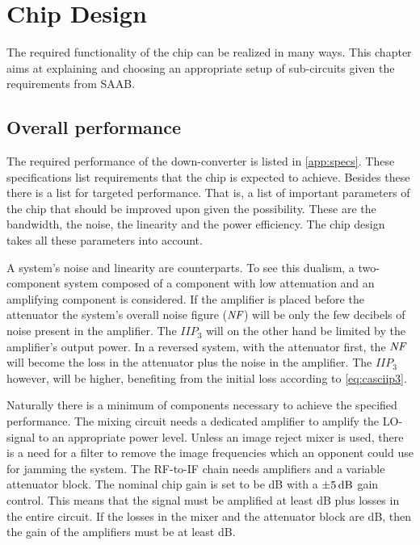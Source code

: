 \chapter{Chip Design}\label{chap:sysdes}

	The required functionality of the chip can be realized in many ways. This chapter aims at explaining and choosing an appropriate setup of sub-circuits given the requirements from SAAB.

	\section{Overall performance}
		The required performance of the down-converter is listed in \autoref{app:specs}. These specifications list requirements that the chip is expected to achieve. Besides these there is a list for targeted performance. That is, a list of important parameters of the chip that should be improved upon given the possibility. These are the bandwidth, the noise, the linearity and the power efficiency. The chip design takes all these parameters into account.

		A system's noise and linearity are counterparts. To see this dualism, a two-component system composed of a component with low attenuation and an amplifying component is considered. If the amplifier is placed before the attenuator the system's overall noise figure ($\emph{NF}$) will be only the few decibels of noise present in the amplifier. The $IIP_3$ will on the other hand be limited by the amplifier's output power. In a reversed system, with the attenuator first, the $\emph{NF}$ will become the loss in the attenuator plus the noise in the amplifier. The $IIP_3$ however, will be higher, benefiting from the initial loss according to \autoref{eq:casciip3}.

		Naturally there is a minimum of components necessary to achieve the specified performance. The mixing circuit needs a dedicated amplifier to amplify the LO-signal to an appropriate power level. Unless an image reject mixer is used, there is a need for a filter to remove the image frequencies which an opponent could use for jamming the system. The RF-to-IF chain needs amplifiers and a variable attenuator block. The nominal chip gain is set to be \unit[8--10]{dB} with a $\unit[\pm 5]{dB}$ gain control. This means that the signal must be amplified at least \unit[13]{dB} plus losses in the entire circuit. If the losses in the mixer and the attenuator block are \unit[10]{dB}, then the gain of the amplifiers must be at least \unit[23]{dB}.

